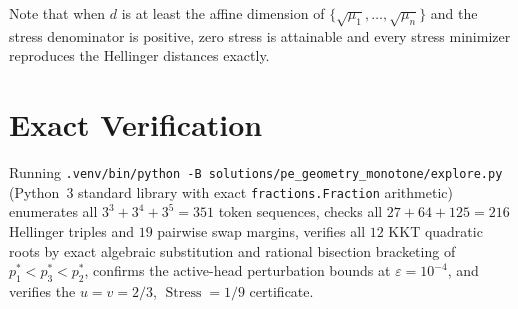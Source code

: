 \documentclass[11pt]{article}
\theoremstyle{plain}
\theoremstyle{definition}
\theoremstyle{remark}
\DeclareMathOperator{\Stress}{Stress}
\begin{document}
Note that when $d$ is at least the affine dimension of $\{\sqrt{\mu_1}, \dots, \sqrt{\mu_n}\}$ and the stress denominator is positive, zero stress is attainable and every stress minimizer reproduces the Hellinger distances exactly.

\section{Exact Verification}

Running \texttt{.venv/bin/python -B solutions/pe\_geometry\_monotone/explore.py} (Python~3 standard library with exact \texttt{fractions.Fraction} arithmetic) enumerates all $3^3 + 3^4 + 3^5 = 351$ token sequences, checks all $27 + 64 + 125 = 216$ Hellinger triples and $19$ pairwise swap margins, verifies all $12$ KKT quadratic roots by exact algebraic substitution and rational bisection bracketing of $p_1^* < p_3^* < p_2^*$, confirms the active-head perturbation bounds at $\varepsilon = 10^{-4}$, and verifies the $u = v = 2/3$, $\Stress = 1/9$ certificate.
\end{document}
